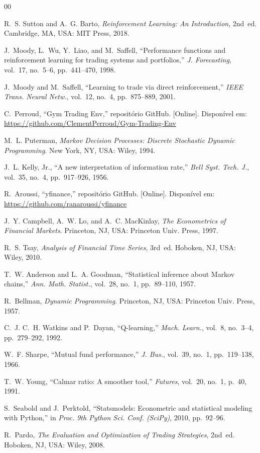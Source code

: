 \documentclass[conference]{IEEEtran}
\begin{document}
\begin{thebibliography}{00}

R.~S. Sutton and A.~G. Barto, \textit{Reinforcement Learning: An Introduction}, 2nd~ed. Cambridge, MA, USA: MIT Press, 2018.

J.~Moody, L.~Wu, Y.~Liao, and M.~Saffell, ``Performance functions and reinforcement learning for trading systems and portfolios,'' \textit{J. Forecasting}, vol.~17, no.~5--6, pp.~441--470, 1998.

J.~Moody and M.~Saffell, ``Learning to trade via direct reinforcement,'' \textit{IEEE Trans. Neural Netw.}, vol.~12, no.~4, pp.~875--889, 2001.

C.~Perroud, ``Gym Trading Env,'' repositório GitHub. [Online]. Disponível em: \url{https://github.com/ClementPerroud/Gym-Trading-Env}

M.~L. Puterman, \textit{Markov Decision Processes: Discrete Stochastic Dynamic Programming}. New York, NY, USA: Wiley, 1994.

J.~L. Kelly, Jr., ``A new interpretation of information rate,'' \textit{Bell Syst. Tech. J.}, vol.~35, no.~4, pp.~917--926, 1956.

R.~Aroussi, ``yfinance,'' repositório GitHub. [Online]. Disponível em: \url{https://github.com/ranaroussi/yfinance}

J.~Y. Campbell, A.~W. Lo, and A.~C. MacKinlay, \textit{The Econometrics of Financial Markets}. Princeton, NJ, USA: Princeton Univ. Press, 1997.

R.~S. Tsay, \textit{Analysis of Financial Time Series}, 3rd~ed. Hoboken, NJ, USA: Wiley, 2010.

T.~W. Anderson and L.~A. Goodman, ``Statistical inference about Markov chains,'' \textit{Ann. Math. Statist.}, vol.~28, no.~1, pp.~89--110, 1957.

R.~Bellman, \textit{Dynamic Programming}. Princeton, NJ, USA: Princeton Univ. Press, 1957.

C.~J. C.~H. Watkins and P.~Dayan, ``Q-learning,'' \textit{Mach. Learn.}, vol.~8, no.~3--4, pp.~279--292, 1992.

W.~F. Sharpe, ``Mutual fund performance,'' \textit{J. Bus.}, vol.~39, no.~1, pp.~119--138, 1966.

T.~W. Young, ``Calmar ratio: A smoother tool,'' \textit{Futures}, vol.~20, no.~1, p.~40, 1991.

S.~Seabold and J.~Perktold, ``Statsmodels: Econometric and statistical modeling with Python,'' in \textit{Proc. 9th Python Sci. Conf. (SciPy)}, 2010, pp.~92--96.

R.~Pardo, \textit{The Evaluation and Optimization of Trading Strategies}, 2nd~ed. Hoboken, NJ, USA: Wiley, 2008.

\end{thebibliography}
\end{document}
